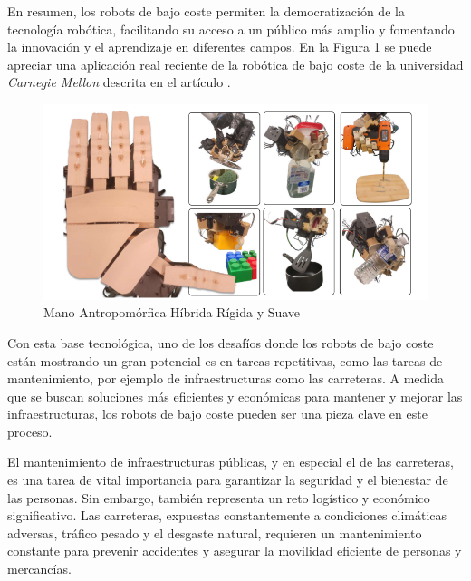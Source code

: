 En resumen, los robots de bajo coste permiten la democratización de la tecnología robótica, facilitando su acceso a un público más amplio y fomentando la innovación y el aprendizaje en diferentes campos. En la Figura \ref{fig:roblowcost} se puede apreciar una aplicación real reciente de la robótica de bajo coste de la universidad \textit{Carnegie Mellon} descrita en el artículo \cite{shaw2024leap}.

\begin{figure} [h!]
	\begin{center}
		\includegraphics[width=16cm]{figs/handlowcost.png}
	\end{center}
	\caption{Mano Antropomórfica Híbrida Rígida y Suave} %
	\label{fig:roblowcost}
\end{figure}


Con esta base tecnológica, uno de los desafíos donde los robots de bajo coste están mostrando un gran potencial es en tareas repetitivas, como las tareas de mantenimiento, por ejemplo de infraestructuras como las carreteras. A medida que se buscan soluciones más eficientes y económicas para mantener y mejorar las infraestructuras, los robots de bajo coste pueden ser una pieza clave en este proceso.

El mantenimiento de infraestructuras públicas, y en especial el de las carreteras, es una tarea de vital importancia para garantizar la seguridad y el bienestar de las personas. Sin embargo, también representa un reto logístico y económico significativo. Las carreteras, expuestas constantemente a condiciones climáticas adversas, tráfico pesado y el desgaste natural, requieren un mantenimiento constante para prevenir accidentes y asegurar la movilidad eficiente de personas y mercancías.

